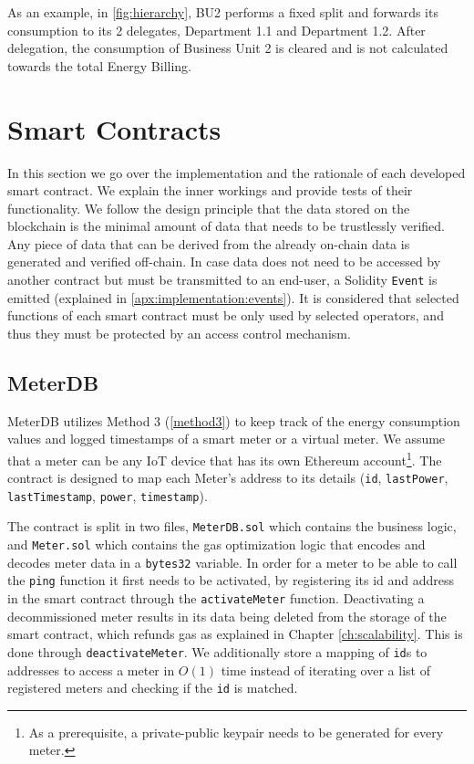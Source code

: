 
As an example, in \ref{fig:hierarchy}, BU2 performs a fixed split and forwards its consumption to its 2 delegates, Department 1.1 and Department 1.2. After delegation, the consumption of Business Unit 2 is cleared and is not calculated towards the total Energy Billing.

\section{Smart Contracts} \label{ch:implementation:sc}
In this section we go over the implementation and the rationale of each developed smart contract. We explain the inner workings and provide tests of their functionality. We follow the design principle that the data stored on the blockchain is the minimal amount of data that needs to be trustlessly verified. Any piece of data that can be derived from the already on-chain data is generated and verified off-chain. In case data does not need to be accessed by another contract but must be transmitted to an end-user, a Solidity \texttt{Event} is emitted (explained in \ref{apx:implementation:events}). It is considered that selected functions of each smart contract must be only used by selected operators, and thus they must be protected by an access control mechanism.

\subsection{MeterDB}
MeterDB utilizes Method 3 (\ref{method3}) to keep track of the energy consumption values and logged timestamps of a smart meter or a virtual meter. We assume that a meter can be any IoT device that has its own Ethereum account\footnote{As a prerequisite, a private-public keypair needs to be generated for every meter.}. The contract is designed to map each Meter's address to its details (\texttt{id}, \texttt{lastPower}, \texttt{lastTimestamp}, \texttt{power}, \texttt{timestamp}).

The contract is split in two files, \texttt{MeterDB.sol} which contains the business logic, and \texttt{Meter.sol} which contains the gas optimization logic that encodes and decodes meter data in a \texttt{bytes32} variable. In order for a meter to be able to call the \texttt{ping} function it first needs to be activated, by registering its id and address in the smart contract through the \texttt{activateMeter} function. Deactivating a decommissioned meter results in its data being deleted from the storage of the smart contract, which refunds gas as explained in Chapter \ref{ch:scalability}. This is done through \texttt{deactivateMeter}. We additionally store a mapping of \texttt{id}s to addresses to access a meter in $O(1)$ time instead of iterating over a list of registered meters and checking if the \texttt{id} is matched.

